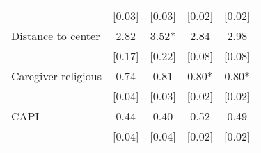 \begin{table}[H]
\begin{adjustbox}{max height=\dimexpr\textheight-5.5cm\relax,max width=\textwidth}
\begin{tabular}{l cccc}
   &   [0.03]   &   [0.03]   &   [0.02]   &   [0.02] \\ 
Distance to center   &   2.82   &   3.52*   &   2.84   &   2.98 \\ 
   &   [0.17]   &   [0.22]   &   [0.08]   &   [0.08] \\ 
Caregiver religious   &   0.74   &   0.81   &   0.80*   &   0.80* \\ 
   &   [0.04]   &   [0.03]   &   [0.02]   &   [0.02] \\ 
CAPI   &   0.44   &   0.40   &   0.52   &   0.49 \\ 
   &   [0.04]   &   [0.04]   &   [0.02]   &   [0.02] \\ 
\hline 
\end{tabular}
\end{adjustbox}


\end{table}
